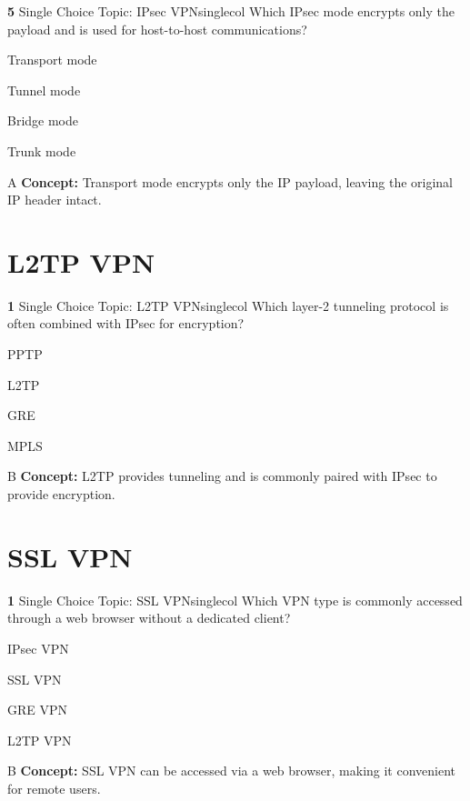 \documentclass[10pt,a4paper]{article}
\begin{document}
\begin{qcard}{\color{white}\textbf{5} \hfill \small Single Choice \textbar{} Topic: IPsec VPN}{singlecol}
Which IPsec mode encrypts only the payload and is used for host-to-host communications?

\begin{qoptions}
\item Transport mode
\item Tunnel mode
\item Bridge mode
\item Trunk mode
\end{qoptions}
\begin{explainbox}{A}
\textbf{Concept:} Transport mode encrypts only the IP payload, leaving the original IP header intact.
\end{explainbox}
\end{qcard}

\section{L2TP VPN}
\begin{qcard}{\color{white}\textbf{1} \hfill \small Single Choice \textbar{} Topic: L2TP VPN}{singlecol}
Which layer-2 tunneling protocol is often combined with IPsec for encryption?

\begin{qoptions}
\item PPTP
\item L2TP
\item GRE
\item MPLS
\end{qoptions}
\begin{explainbox}{B}
\textbf{Concept:} L2TP provides tunneling and is commonly paired with IPsec to provide encryption.
\end{explainbox}
\end{qcard}

\section{SSL VPN}
\begin{qcard}{\color{white}\textbf{1} \hfill \small Single Choice \textbar{} Topic: SSL VPN}{singlecol}
Which VPN type is commonly accessed through a web browser without a dedicated client?

\begin{qoptions}
\item IPsec VPN
\item SSL VPN
\item GRE VPN
\item L2TP VPN
\end{qoptions}
\begin{explainbox}{B}
\textbf{Concept:} SSL VPN can be accessed via a web browser, making it convenient for remote users.
\end{explainbox}
\end{qcard}
\end{document}

